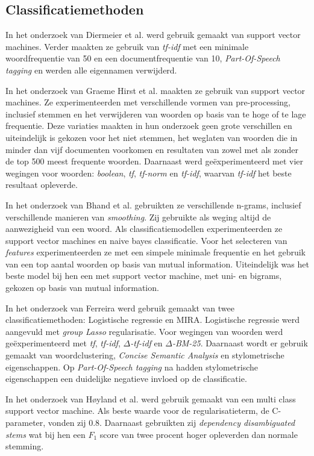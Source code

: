 \subsection{Classificatiemethoden}
\label{sec:Deelvraag1}
In het onderzoek van Diermeier et al. werd gebruik gemaakt van support vector machines. Verder maakten ze gebruik van \textit{tf-idf} met een minimale woordfrequentie van 50 en een documentfrequentie van 10, \textit{Part-Of-Speech tagging} en werden alle eigennamen verwijderd.\par
In het onderzoek van Graeme Hirst et al. maakten ze gebruik van support vector machines\cite{Hirst_textto}. Ze experimenteerden met verschillende vormen van pre-processing, inclusief stemmen en het verwijderen van woorden op basis van te hoge of te lage frequentie. Deze variaties maakten in hun onderzoek geen grote verschillen en uiteindelijk is gekozen voor het niet stemmen, het weglaten van woorden die in minder dan vijf documenten voorkomen en resultaten van zowel met als zonder de top 500 meest frequente woorden. Daarnaast werd geëxperimenteerd met vier wegingen voor woorden: \textit{boolean}, \textit{tf}, \textit{tf-norm} en \textit{tf-idf}, waarvan \textit{tf-idf} het beste resultaat opleverde. \par
In het onderzoek van Bhand et al. gebruikten ze verschillende n-grams, inclusief verschillende manieren van \textit{smoothing}\cite{bhand}. Zij gebruikte als weging altijd de aanwezigheid van een woord. Als classificatiemodellen experimenteerden ze support vector machines en naive bayes classificatie. Voor het selecteren van \textit{features} experimenteerden ze met een simpele minimale frequentie en het gebruik van een top aantal woorden op basis van mutual information. Uiteindelijk was het beste model bij hen een met support vector machine, met uni- en bigrams, gekozen op basis van mutual information.\par
In het onderzoek van Ferreira werd gebruik gemaakt van twee classificatiemethoden: Logistische regressie en MIRA\cite{Ferreira2016UsingTT}. Logistische regressie werd aangevuld met \textit{group Lasso} regularisatie. Voor wegingen van woorden werd geëxperimenteerd met \textit{tf}, \textit{tf-idf}, \textit{$\Delta$-tf-idf} en \textit{$\Delta$-BM-25}. Daarnaast wordt er gebruik gemaakt van woordclustering, \textit{Concise Semantic Analysis} en stylometrische eigenschappen. Op \textit{Part-Of-Speech tagging} na hadden stylometrische eigenschappen een duidelijke negatieve invloed op de classificatie.\par
In het onderzoek van Høyland et al. werd gebruik gemaakt van een multi class support vector machine\cite{W14-2516}. Als beste waarde voor de regularisatieterm, de C-parameter, vonden zij 0.8. Daarnaast gebruikten zij \textit{dependency disambiguated
stems} wat bij hen een $F_1$ score van twee procent hoger opleverden dan normale stemming.\par

